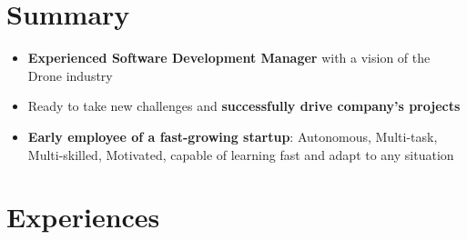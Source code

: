 \documentclass[a4paper]{friggeri-cv} %
\begin{document}
\section{Summary}
\begin{itemize}
\item \textbf{Experienced Software Development Manager} with a vision of the Drone industry
\item Ready to take new challenges and \textbf{successfully drive company's projects}%
\item \textbf{Early employee of a fast-growing startup}: Autonomous, Multi-task, Multi-skilled, Motivated, capable of learning fast and adapt to any situation
\end{itemize}



\section{Experiences}
\end{document}
